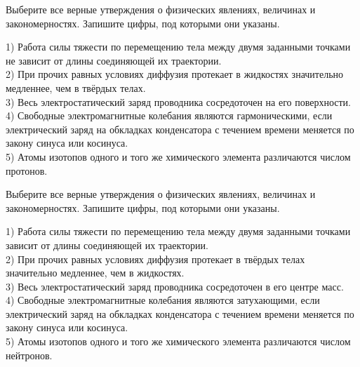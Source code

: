 
\begin{taskbasic}[code={\label{task:kim18_v01}}]
Выберите все верные утверждения о физических явлениях, величинах и закономерностях. Запишите цифры, под которыми они указаны.

1) Работа силы тяжести по перемещению тела между двумя заданными точками не зависит от длины соединяющей их траектории.\\
2) При прочих равных условиях диффузия протекает в жидкостях значительно медленнее, чем в твёрдых телах.\\
3) Весь электростатический заряд проводника сосредоточен на его поверхности.\\
4) Свободные электромагнитные колебания являются гармоническими, если электрический заряд на обкладках конденсатора с течением времени меняется по закону синуса или косинуса.\\
5) Атомы изотопов одного и того же химического элемента различаются числом протонов.

\end{taskbasic}

\begin{taskbasic}[code={\label{task:kim18_v02}}]
Выберите все верные утверждения о физических явлениях, величинах и закономерностях. Запишите цифры, под которыми они указаны.

1) Работа силы тяжести по перемещению тела между двумя заданными точками зависит от длины соединяющей их траектории.\\
2) При прочих равных условиях диффузия протекает в твёрдых телах значительно медленнее, чем в жидкостях.\\
3) Весь электростатический заряд проводника сосредоточен в его центре масс.\\
4) Свободные электромагнитные колебания являются затухающими, если электрический заряд на обкладках конденсатора с течением времени меняется по закону синуса или косинуса.\\
5) Атомы изотопов одного и того же химического элемента различаются числом нейтронов.

\end{taskbasic}

